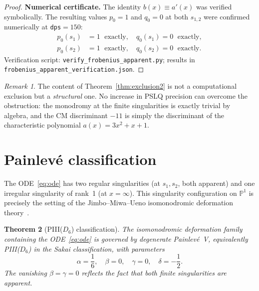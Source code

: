 \documentclass[11pt,a4paper]{article}
\newtheorem{theorem}{Theorem}[section]
\theoremstyle{definition}
\theoremstyle{remark}
\newtheorem{remark}[theorem]{Remark}
\begin{document}
\begin{proof}
\medskip
\noindent\textbf{Numerical certificate.}
The identity $b(x) \equiv a'(x)$
was verified symbolically.
The resulting values $p_0 = 1$ and
$q_0 = 0$ at both $s_{1,2}$ were
confirmed numerically at
\texttt{dps}$=150$:
\begin{align*}
  p_0(s_1) &= 1\;\text{ exactly},\quad
  q_0(s_1) = 0\;\text{ exactly},\\
  p_0(s_2) &= 1\;\text{ exactly},\quad
  q_0(s_2) = 0\;\text{ exactly}.
\end{align*}
Verification script:
\texttt{verify\_frobenius\_apparent.py};
results in\\
\texttt{frobenius\_apparent\_verification.json}.
\end{proof}

\begin{remark}
The content of Theorem~\ref{thm:exclusion2}
is not a computational exclusion but a
\emph{structural} one. No increase in PSLQ
precision can overcome the obstruction: the
monodromy at the finite singularities is
exactly trivial by algebra, and the CM
discriminant $-11$ is simply the discriminant
of the characteristic polynomial
$a(x)=3x^2+x+1$.
\end{remark}


\section{Painlev\'e classification}
\label{sec:painleve}

The ODE~\eqref{eq:ode} has two regular
singularities (at $s_1,s_2$, both apparent)
and one irregular singularity of rank~1
(at $x=\infty$). This singularity
configuration on $\mathbb{P}^1$ is precisely
the setting of the Jimbo--Miwa--Ueno
isomonodromic deformation
theory~\cite{jimbo1981}.

\begin{theorem}[PIII($D_6$) classification]
\label{thm:painleve}
The isomonodromic deformation family
containing the ODE~\eqref{eq:ode} is
governed by degenerate Painlev\'e~V,
equivalently PIII($D_6$)
in the Sakai classification, with
parameters
\[
  \alpha = \frac{1}{6},\quad
  \beta = 0,\quad
  \gamma = 0,\quad
  \delta = -\frac{1}{2}.
\]
The vanishing $\beta = \gamma = 0$ reflects
the fact that both finite singularities are
apparent.
\end{theorem}
\end{document}
